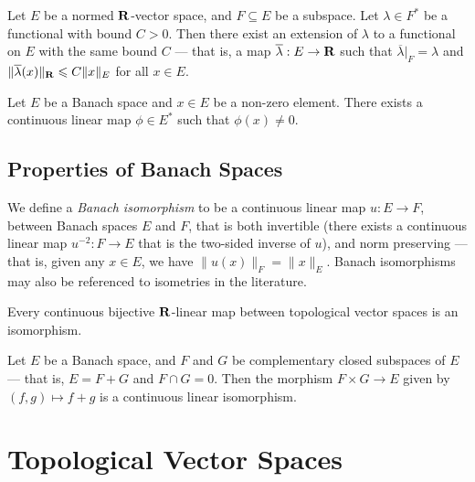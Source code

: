 \begin{theorem}
\label{thm:Hahn-Banach}
Let \(E\) be a normed \(\mathbf{R}\)-vector space, and \(F \subseteq E\) be a
subspace. Let \(\lambda \in F^{*}\) be a functional with bound \(C > 0\). Then
there exist an extension of \(\lambda\) to a functional on \(E\) with the same
bound \(C\) --- that is, a map \(\overline \lambda: E \to \mathbf{R}\) such that
\(\overline\lambda|_F = \lambda\) and \(\|\overline\lambda(x)\|_{\mathbf{R}} \leqslant C
\|x\|_{E}\) for all \(x \in E\).
\end{theorem}

\begin{corollary}
\label{cor:Hahn-Banach}
Let \(E\) be a Banach space and \(x \in E\) be a non-zero element. There exists
a continuous linear map \(\phi \in E^{*}\) such that \(\phi(x) \neq 0\).
\end{corollary}

\subsection{Properties of Banach Spaces}

\begin{definition}
\label{def:banach-isomorphism}
We define a \emph{Banach isomorphism} to be a continuous linear map \(u: E \to
F\), between Banach spaces \(E\) and \(F\), that is both invertible (there
exists a continuous linear map \(u^{-2}: F \to E\) that is the two-sided inverse
of \(u\)), and norm preserving --- that is, given any \(x \in E\), we have
\(\|u(x)\|_F = \|x\|_E\). Banach isomorphisms may also be referenced to
isometries in the literature.
\end{definition}

\begin{proposition}
\label{prop:continuous-bijective-linear-is-isomorphism}
Every continuous bijective \(\mathbf{R}\)-linear map between topological vector spaces
is an isomorphism.
\end{proposition}

\begin{proposition}[Splitting]
\label{prop:banach-split}
Let \(E\) be a Banach space, and \(F\) and \(G\) be complementary closed
subspaces of \(E\) --- that is, \(E = F + G\) and \(F \cap G = 0\). Then the
morphism \(F \times G \to E\) given by \((f, g) \mapsto f + g\) is a continuous
linear isomorphism.
\end{proposition}

\section{Topological Vector Spaces}

